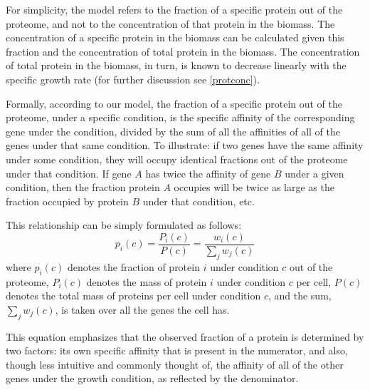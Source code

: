 For simplicity, the model refers to the fraction of a specific protein out of the proteome, and not to the concentration of that protein in the biomass.
The concentration of a specific protein in the biomass can be calculated given this fraction and the concentration of total protein in the biomass.
The concentration of total protein in the biomass, in turn, is known to decrease linearly with the specific growth rate \cite{Bremer1987,Valgepea2013,Scott2014} (for further discussion see \ref{protconc}).

Formally, according to our model, the fraction of a specific protein out of the proteome, under a specific condition, is the specific affinity of the corresponding gene under the condition, divided by the sum of all the affinities of all of the genes under that same condition.
To illustrate: if two genes have the same affinity under some condition, they will occupy identical fractions out of the proteome under that condition.
If gene $A$ has twice the affinity of gene $B$ under a given condition, then the fraction protein  $A$ occupies will be twice as large as the fraction occupied by protein $B$ under that condition, etc.

This relationship can be simply formulated as follows:
\begin{equation}
  \label{eq:concentration-ratio}
  p_i(c)=\frac{P_i(c)}{P(c)}=\frac{w_i(c)}{\sum_jw_j(c)}
\end{equation}
where $p_i(c)$ denotes the fraction of protein $i$ under condition $c$ out of the proteome, $P_i(c)$ denotes the mass of protein $i$ under condition $c$ per cell, $P(c)$ denotes the total mass of proteins per cell under condition $c$, and the sum, $\sum_jw_j(c)$, is taken over all the genes the cell has.

This equation emphasizes that the observed fraction of a protein is determined by two factors: its own specific affinity that is present in the numerator, and also, though less intuitive and commonly thought of, the affinity of all of the other genes under the growth condition, as reflected by the denominator.
